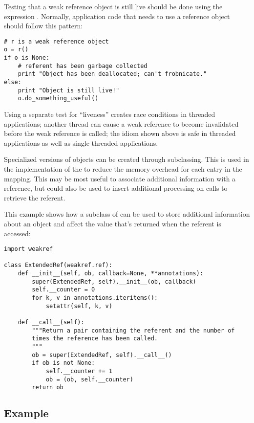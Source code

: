Testing that a weak reference object is still live should be done
using the expression .  Normally,
application code that needs to use a reference object should follow
this pattern:

\begin{verbatim}
# r is a weak reference object
o = r()
if o is None:
    # referent has been garbage collected
    print "Object has been deallocated; can't frobnicate."
else:
    print "Object is still live!"
    o.do_something_useful()
\end{verbatim}

Using a separate test for ``liveness'' creates race conditions in
threaded applications; another thread can cause a weak reference to
become invalidated before the weak reference is called; the
idiom shown above is safe in threaded applications as well as
single-threaded applications.

Specialized versions of  objects can be created through
subclassing.  This is used in the implementation of the
 to reduce the memory overhead for each
entry in the mapping.  This may be most useful to associate additional
information with a reference, but could also be used to insert
additional processing on calls to retrieve the referent.

This example shows how a subclass of  can be used to store
additional information about an object and affect the value that's
returned when the referent is accessed:

\begin{verbatim}
import weakref

class ExtendedRef(weakref.ref):
    def __init__(self, ob, callback=None, **annotations):
        super(ExtendedRef, self).__init__(ob, callback)
        self.__counter = 0
        for k, v in annotations.iteritems():
            setattr(self, k, v)

    def __call__(self):
        """Return a pair containing the referent and the number of
        times the reference has been called.
        """
        ob = super(ExtendedRef, self).__call__()
        if ob is not None:
            self.__counter += 1
            ob = (ob, self.__counter)
        return ob
\end{verbatim}


\subsection{Example \label{weakref-example}}

